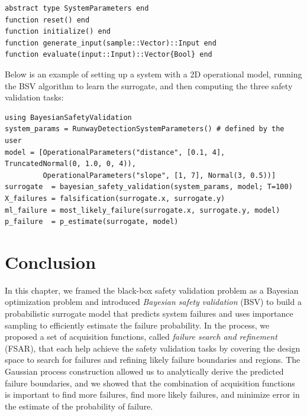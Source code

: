 \vspace*{3mm}
\begin{juliaframe}
\begin{lstlisting}[language=JuliaLocal, style=julia]
abstract type SystemParameters end
function reset() end
function initialize() end
function generate_input(sample::Vector)::Input end
function evaluate(input::Input)::Vector{Bool} end
\end{lstlisting}
\end{juliaframe}
\vspace*{-0.5mm}
Below is an example of setting up a system with a 2D operational model, running the BSV algorithm to learn the surrogate, and then computing the three safety validation tasks:
\vspace*{1mm}
\begin{juliaframe}
\begin{lstlisting}[language=JuliaLocal, style=julia]
using BayesianSafetyValidation
system_params = RunwayDetectionSystemParameters() # defined by the user
model = [OperationalParameters("distance", [0.1, 4], TruncatedNormal(0, 1.0, 0, 4)),
         OperationalParameters("slope", [1, 7], Normal(3, 0.5))]
surrogate  = bayesian_safety_validation(system_params, model; T=100)
X_failures = falsification(surrogate.x, surrogate.y)
ml_failure = most_likely_failure(surrogate.x, surrogate.y, model)
p_failure  = p_estimate(surrogate, model)
\end{lstlisting}
\end{juliaframe}


\section{Conclusion}\label{sec:conclusion}
In this chapter, we framed the black-box safety validation problem as a Bayesian optimization problem and introduced \textit{Bayesian safety validation} (BSV) to build a probabilistic surrogate model that predicts system failures and uses importance sampling to efficiently estimate the failure probability.
In the process, we proposed a set of acquisition functions, called \textit{failure search and refinement} (FSAR), that each help achieve the safety validation tasks by covering the design space to search for failures and refining likely failure boundaries and regions.
The Gaussian process construction allowed us to analytically derive the predicted failure boundaries, and we showed that the combination of acquisition functions is important to find more failures, find more likely failures, and minimize error in the estimate of the probability of failure.

